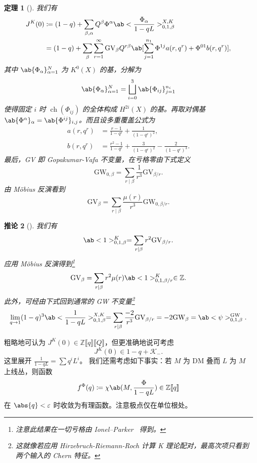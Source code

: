 \documentclass{amsart}
\newtheorem{thm}{定理}[section]
\newtheorem{cor}[thm]{推论}
\theoremstyle{definition}
\theoremstyle{remark}
\theoremstyle{plain}
\theoremstyle{definition}
\theoremstyle{remark}
\newcommand{\Z}{\mathbb{Z}}
\newcommand{\ep}{\varepsilon}
\newcommand{\mc}[1]{\mathcal{#1}}
\newcommand{\mr}[1]{\mathrm{#1}}
\newcommand{\1}{\mathbf{1}}
\newcommand{\2}{\mathbf{2}}
\newcommand{\3}{\mathbf{3}}
\newcommand{\ps}[1]{\llbracket #1 \rrbracket}
\DeclareMathOperator{\ch}{ch}
\begin{document}
\begin{thm}[{\cite{ChouLee2025}}]
    我们有
    \begin{align*}
        J^K(0) &\coloneqq (1-q) + \sum_{\beta, \alpha} Q^{\beta} \Phi^{\alpha} \ab<\frac{\Phi_{\alpha}}{1-qL}>_{0,1,\beta}^{X,K} \\
        &= (1-q) + \sum_{\beta} \sum_{r=1}^{\infty} \mr{GV}_{\beta} Q^{r\beta} \ab[\sum_{j=1}^{n_1} \Phi^{1j} a(r, q^r) + \Phi^{01} b(r, q^r)],
    \end{align*}
    其中 \(\ab\{\Phi_{\alpha}\}_{\alpha=1}^N\) 为 \(K^0(X)\) 的基，分解为
    \[ \ab\{\Phi_{\alpha}\}_{\alpha=1}^N = \bigsqcup_{i=0}^3 \ab\{\Phi_{ij}\}_{j=1}^{n_i} \]
    使得固定 \(i\) 时 \(\ch(\Phi_{ij})\) 的全体构成 \(H^{2i}(X)\) 的基。再取对偶基 \(\ab\{\Phi^{\alpha}\}_{\alpha} = \ab\{\Phi^{ij}\}_{i,j}\)。而且设多重覆盖公式为
    \begin{align*}
        a(r, q^r) &= \frac{r-1}{1-q^r} + \frac{1}{(1-q^r)^2}, \\
        b(r, q^r) &= \frac{r^2-1}{1-q^r} + \frac{3}{(1-q^r)^2} - \frac{2}{(1-q^r)^3}.
    \end{align*}
    最后，GV 即 Gopakumar-Vafa 不变量，在亏格零由下式定义
    \[ \mr{GW}_{0,\beta} = \sum_{r \mid \beta} \frac{1}{r^3} \mr{GV}_{\beta/r}. \]
    由 M\"obius 反演看到
    \[ \mr{GV}_{\beta} = \sum_{r \mid \beta} \frac{\mu(r)}{r^3} \mr{GW}_{0,\beta/r}. \]
\end{thm}

\begin{cor}[{\cite{ChouLee2025}}]
    我们有
    \[ \ab<1>_{0,1,\beta}^K = \sum_{r \mid \beta} r^2 \mr{GV}_{\beta/r}. \]
    应用 M\"obius 反演得到\footnote{注意此结果在一切亏格由 Ionel--Parker~\cite{IonelParker2018} 得到。}
    \[ \mr{GV}_{\beta} = \sum_{r \mid \beta} r^2 \mu(r) \ab<1>_{0,1,\beta/r}^K \in \Z. \]
    此外，可经由下式回到通常的 GW 不变量\footnote{这就像若应用 Hirzebruch-Riemann-Roch 计算 K 理论配对，最高次项只看到两个输入的 Chern 特征。}
    \[ \lim_{q \to 1} (1-q)^3 \ab<\frac{1}{1-qL}>_{0,1,\beta}^{X,K} = \sum_{r \mid \beta} \frac{-2}{r^3} \mr{GV}_{\beta/r} = -2 \mr{GW}_{\beta} = \ab<\psi>_{0,1,\beta}^{\mr{GW}}. \]
\end{cor}

粗略地可认为 \(J^K(0) \in \Z\ps{q}\ps{Q}\)，但更准确地说可考虑
\[ J^K(0) \in 1-q + \mc{K}_-. \]
这里展开 \(\frac{1}{1-qL} = \sum q^i L^i\)。
我们还需考虑如下事实：若 \(M\) 为 DM 叠而 \(L\) 为 \(M\) 上线丛，则函数
\[ f^{\Phi}(q) \coloneqq \chi\ab(M, \frac{\Phi}{1-qL}) \in \Z \ps{q} \]
在 \(\abs{q} < \ep\) 时收敛为有理函数。注意极点仅在单位根处。
\end{document}

